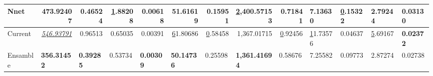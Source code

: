 \begin{table}[]
\begin{tabular}{@{}lrrrrrrrrllll@{}}
\multicolumn{1}{|l|}{Nnet}                   & \multicolumn{1}{r|}{473.92407}                & \multicolumn{1}{r|}{0.46524}         & \multicolumn{1}{r|}{{\ul 1.88208}}    & \multicolumn{1}{r|}{0.00618}         & \multicolumn{1}{r|}{51.61619}         & \multicolumn{1}{r|}{\textbf{0.15951}} & \multicolumn{1}{r|}{{\ul 2,400.57153}}   & \multicolumn{1}{r|}{0.71841}          & \multicolumn{1}{l|}{\textbf{7.13630}} & \multicolumn{1}{l|}{{\ul 0.15322}}    & \multicolumn{1}{l|}{\textbf{2.79244}} & \multicolumn{1}{l|}{0.03130}          \\ \midrule
\multicolumn{1}{|l|}{Current}                & \multicolumn{1}{r|}{{\ul \textit{546.93791}}} & \multicolumn{1}{r|}{0.96513}         & \multicolumn{1}{r|}{0.65035}          & \multicolumn{1}{r|}{0.00391}         & \multicolumn{1}{r|}{{\ul 61.80686}}   & \multicolumn{1}{r|}{{\ul 0.58458}}    & \multicolumn{1}{r|}{1,367.01715}         & \multicolumn{1}{r|}{{\ul 0.92456}}    & \multicolumn{1}{l|}{{\ul 11.73576}}   & \multicolumn{1}{l|}{0.04637}          & \multicolumn{1}{l|}{{\ul 5.69167}}    & \multicolumn{1}{l|}{\textbf{0.02372}} \\ \midrule
Ensamble                                     & \multicolumn{1}{l}{\textbf{356.31452}}        & \multicolumn{1}{l}{\textbf{0.39285}} & \multicolumn{1}{l}{0.53734}           & \multicolumn{1}{l}{\textbf{0.00309}} & \multicolumn{1}{l}{\textbf{50.14736}} & \multicolumn{1}{l}{0.25598}           & \multicolumn{1}{l}{\textbf{1,361.41694}} & \multicolumn{1}{l}{0.58676}           & 7.25582                               & 0.09773                               & 2.87274                               & 0.02738                               \\ \bottomrule
\end{tabular}
\end{table}